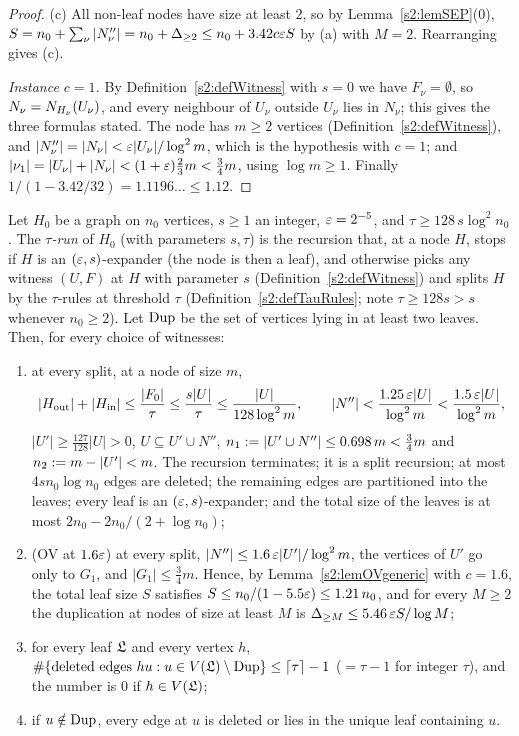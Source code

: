 \begin{proof}
(c) All non-leaf nodes have size at least $2$, so by
Lemma~\ref{s2:lemSEP}(0), $S=n_0+\sum_\nu|N''_\nu|=n_0+\Delta_{\ge2}\le
n_0+3.42c\varepsilon S$ by (a) with $M=2$. Rearranging gives (c).

\emph{Instance $c=1$.} By Definition~\ref{s2:defWitness} with $s=0$ we have
$F_\nu=\emptyset$, so $N_\nu=N_{H_\nu}(U_\nu)$, and every neighbour of
$U_\nu$ outside $U_\nu$ lies in $N_\nu$; this gives the three formulas stated.
The node has $m\ge2$ vertices (Definition~\ref{s2:defWitness}), and
$|N''_\nu|=|N_\nu|<\varepsilon|U_\nu|/\log^2m$, which is the hypothesis with $c=1$;
and $|\nu_1|=|U_\nu|+|N_\nu|<(1+\varepsilon)\frac23m<\frac34m$, using $\log m\ge1$.
Finally $1/(1-3.42/32)=1.1196\ldots\le1.12$.
\end{proof}

\begin{lemma}\label{s2:lem14tau}
Let $H_0$ be a graph on $n_0$ vertices, $s\ge1$ an integer, $\varepsilon=2^{-5}$, and
$\tau\ge128\,s\log^2n_0$. The \emph{$\tau$-run} of $H_0$ (with parameters
$s,\tau$) is the recursion that, at a node $H$, stops if $H$ is an
$(\varepsilon,s)$-expander (the node is then a leaf), and otherwise picks any witness
$(U,F)$ at $H$ with parameter $s$ (Definition~\ref{s2:defWitness}) and splits
$H$ by the $\tau$-rules at threshold $\tau$ (Definition~\ref{s2:defTauRules};
note $\tau\ge128s>s$ whenever $n_0\ge2$). Let $\mathrm{Dup}$ be the set of vertices
lying in at least two leaves. Then, for every choice of witnesses:
\begin{enumerate}
\item[(a)] at every split, at a node of size $m$,
\[
|H_{\mathrm{out}}|+|H_{\mathrm{in}}|\le\frac{|F_0|}{\tau}\le\frac{s|U|}{\tau}\le\frac{|U|}{128\log^2m},
\qquad |N''|<\frac{1.25\,\varepsilon|U|}{\log^2m}<\frac{1.5\,\varepsilon|U|}{\log^2m},
\]
$|U'|\ge\frac{127}{128}|U|>0$, $U\subseteq U'\cup N''$, $n_1\mathrel{:=}|U'\cup
N''|\le0.698\,m<\frac34m$ and $n_2\mathrel{:=} m-|U'|<m$. The recursion terminates;
it is a split recursion; at most $4sn_0\log n_0$ edges are deleted; the
remaining edges are partitioned into the leaves; every leaf is an
$(\varepsilon,s)$-expander; and the total size of the leaves is at most
$2n_0-2n_0/(2+\log n_0)$;
\item[(b)] (OV at $1.6\varepsilon$) at every split, $|N''|\le1.6\,\varepsilon|U'|/\log^2m$,
the vertices of $U'$ go only to $G_1$, and $|G_1|\le\frac34m$. Hence, by
Lemma~\ref{s2:lemOVgeneric} with $c=1.6$, the total leaf size $S$ satisfies
$S\le n_0/(1-5.5\varepsilon)\le1.21\,n_0$, and for every $M\ge2$ the duplication at
nodes of size at least $M$ is $\Delta_{\ge M}\le5.46\,\varepsilon S/\log M$;
\item[(c)] for every leaf $\mathfrak{L}$ and every vertex $h$,
$\#\{\text{deleted edges }hu:u\in V(\mathfrak{L})\setminus\mathrm{Dup}\}\le\lceil\tau\rceil-1$
($=\tau-1$ for integer $\tau$), and the number is $0$ if $h\in V(\mathfrak{L})$;
\item[(d)] if $u\notin\mathrm{Dup}$, every edge at $u$ is deleted or lies in the unique
leaf containing $u$.
\end{enumerate}
\deps{\ref{s1:citLem14}, \ref{s1:citDef11}, \ref{s2:defTauRules}, \ref{s2:lemThinCut}, \ref{s2:lemOVgeneric}, \ref{s2:lemSEP}, \ref{s2:defWitness}}
\end{lemma}

